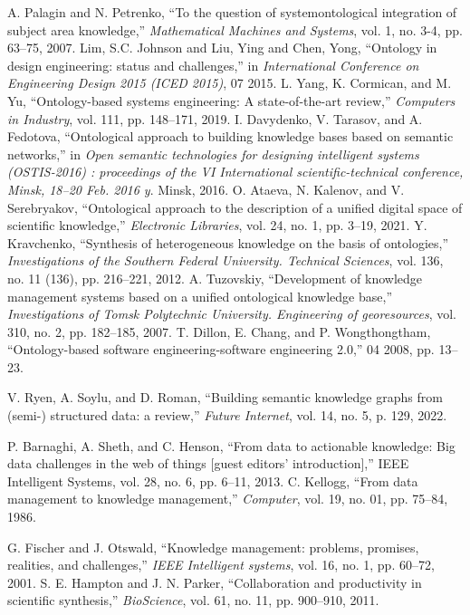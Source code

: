 \documentclass[a4paper]{article}
\begin{document}
\begin{multicols}{2}
\begin{center}
\begin{thebibliography}{46}
     A. Palagin and N. Petrenko, “To the question of systemontological integration of subject area knowledge,” \textit{Mathematical
Machines and Systems}, vol. 1, no. 3-4, pp. 63–75, 2007.
    Lim, S.C. Johnson and Liu, Ying and Chen, Yong, “Ontology
in design engineering: status and challenges,” in \textit{International
Conference on Engineering Design 2015 (ICED 2015)}, 07 2015.
    L. Yang, K. Cormican, and M. Yu, “Ontology-based systems
engineering: A state-of-the-art review,” \textit{Computers in Industry},
vol. 111, pp. 148–171, 2019.
    I. Davydenko, V. Tarasov, and A. Fedotova, “Ontological
approach to building knowledge bases based on semantic
networks,” in \textit{Open semantic technologies for designing intelligent
systems (OSTIS-2016) : proceedings of the VI International
scientific-technical conference, Minsk, 18–20 Feb. 2016 y}. Minsk,
2016.
O. Ataeva, N. Kalenov, and V. Serebryakov, “Ontological approach to the description of a unified digital space of scientific
knowledge,” \textit{Electronic Libraries}, vol. 24, no. 1, pp. 3–19, 2021.
     Y. Kravchenko, “Synthesis of heterogeneous knowledge on the
basis of ontologies,” \textit{Investigations of the Southern Federal University. Technical Sciences}, vol. 136, no. 11 (136), pp. 216–221,
2012.
      A. Tuzovskiy, “Development of knowledge management systems
based on a unified ontological knowledge base,” \textit{Investigations of
Tomsk Polytechnic University. Engineering of georesources}, vol.
310, no. 2, pp. 182–185, 2007.
     T. Dillon, E. Chang, and P. Wongthongtham, “Ontology-based
software engineering-software engineering 2.0,” 04 2008, pp. 13–
23.

      V. Ryen, A. Soylu, and D. Roman, “Building semantic knowledge
graphs from (semi-) structured data: a review,” \textit{Future Internet},
vol. 14, no. 5, p. 129, 2022.

     P. Barnaghi, A. Sheth, and C. Henson, “From data to actionable
knowledge: Big data challenges in the web of things [guest editors’
introduction],” IEEE Intelligent Systems, vol. 28, no. 6, pp. 6–11,
2013.
    C. Kellogg, “From data management to knowledge management,”
\textit{Computer}, vol. 19, no. 01, pp. 75–84, 1986.

     G. Fischer and J. Otswald, “Knowledge management: problems,
promises, realities, and challenges,” \textit{IEEE Intelligent systems},
vol. 16, no. 1, pp. 60–72, 2001.
     S. E. Hampton and J. N. Parker, “Collaboration and productivity
in scientific synthesis,” \textit{BioScience}, vol. 61, no. 11, pp. 900–910,
2011.


\end{thebibliography}
\end{center}
\end{multicols}
\end{document}
